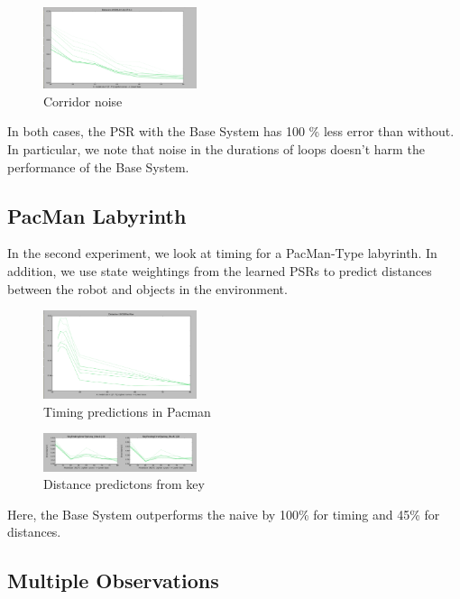 \documentclass{acm_proc_article-sp}
\begin{document}
\begin{figure}[ht!]
\centering
\includegraphics[width=45mm]{lucasplots/doubleloop0_1.png}
\caption{Corridor noise \label{overflow}}
\end{figure}

In both cases, the PSR with the Base System has 100 \% less error than without. In particular, we note that noise in the durations of loops doesn't harm the performance of the Base System.

\subsection{PacMan Labyrinth}

In the second experiment, we look at timing for a PacMan-Type labyrinth. In addition, we use state weightings from the learned PSRs to predict distances between the robot and objects in the environment. 

\begin{figure}[ht!]
\centering
\includegraphics[width=45mm]{lucasplots/pacman10000.png}
\caption{Timing predictions in Pacman \label{overflow}}
\end{figure}


\begin{figure}[ht!]
\centering
\includegraphics[width=45mm]{lucasplots/Distance.png}
\caption{Distance predictons from key \label{overflow}}
\end{figure}

Here, the Base System outperforms the naive by 100\% for timing and 45\% for distances.

\subsection{Multiple Observations}
\end{document}
